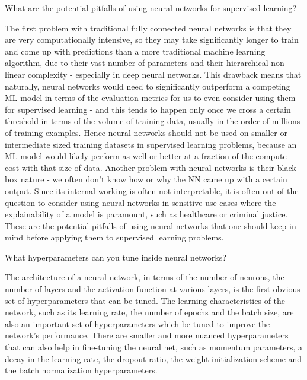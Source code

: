 	\begin{qanda}
		\begin{question}
What are the potential pitfalls of using neural networks for supervised learning?
		\end{question}
		\begin{answer}
The first problem with traditional fully connected neural networks is that they are very computationally intensive, so they may take significantly longer to train and come up with predictions than a more traditional machine learning algorithm, due to their vast number of parameters and their hierarchical non-linear complexity - especially in deep neural networks. This drawback means that naturally, neural networks would need to significantly outperform a competing ML model in terms of the evaluation metrics for us to even consider using them for supervised learning - and this tends to happen only once we cross a certain threshold in terms of the volume of training data, usually in the order of millions of training examples. Hence neural networks should not be used on smaller or intermediate sized training datasets in supervised learning problems, because an ML model would likely perform as well or better at a fraction of the compute cost with that size of data. Another problem with neural networks is their black-box nature - we often don't know how or why the NN came up with a certain output. Since its internal working is often not interpretable, it is often out of the question to consider using neural networks in sensitive use cases where the explainability of a model is paramount, such as healthcare or criminal justice. These are the potential pitfalls of using neural networks that one should keep in mind before applying them to supervised learning problems.
		\end{answer}
	\end{qanda}

	\begin{qanda}
		\begin{question}
What hyperparameters can you tune inside neural networks?
		\end{question}
		\begin{answer}
The architecture of a neural network, in terms of the number of neurons, the number of layers and the activation function at various layers, is the first obvious set of hyperparameters that can be tuned. The learning characteristics of the network, such as its learning rate, the number of epochs and the batch size, are also an important set of hyperparameters which be tuned to improve the network's performance. There are smaller and more nuanced hyperparameters that can also help in fine-tuning the neural net, such as momentum parameters, a decay in the learning rate, the dropout ratio, the weight initialization scheme and the batch normalization hyperparameters.
		\end{answer}
	\end{qanda}

